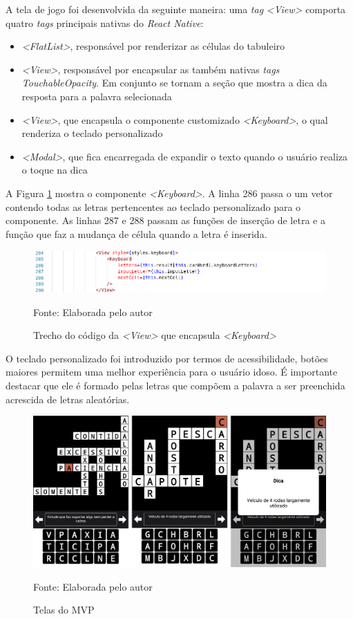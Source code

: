 A tela de jogo foi desenvolvida da seguinte maneira: uma \textit{tag} \textit{<View>} comporta quatro \textit{tags} principais nativas do \textit{React Native}:

\begin{itemize}
    \item \textit{<FlatList>}, responsável por renderizar as células do tabuleiro
    \item \textit{<View>}, responsável por encapsular as também nativas \textit{tags} \textit{TouchableOpacity}. Em conjunto se tornam a seção que mostra a dica da resposta para a palavra selecionada 
    \item \textit{<View>}, que encapsula o componente customizado \textit{<Keyboard>}, o qual renderiza o teclado personalizado
    \item \textit{<Modal>}, que fica encarregada de expandir o texto quando o usuário realiza o toque na dica
\end{itemize}

A Figura \ref{fig:keyboard} mostra o componente \textit{<Keyboard>}. A linha 286 passa o um vetor contendo todas as letras pertencentes ao teclado personalizado para o componente. As linhas 287 e 288 passam as funções de inserção de letra e a função que faz a mudança de célula quando a letra é inserida. 

\begin{figure}[H]
\centering
    \caption{Trecho do código da \textit{<View>} que encapsula \textit{<Keyboard>}}
    \label{fig:keyboard}
    \includegraphics[width=1.0\textwidth]{Figuras/codeKeyboard.png}
    
    Fonte: Elaborada pelo autor
\end{figure}

O teclado personalizado foi introduzido por termos de acessibilidade, botões maiores permitem uma melhor experiência para o usuário idoso. É importante destacar que ele é formado pelas letras que compõem a palavra a ser preenchida acrescida de letras aleatórias.

\begin{figure}[H]
\centering
    \caption{Telas do MVP}
    \label{fig:mvp}
    \includegraphics[width=1.0\textwidth]{Figuras/mvp.png}
    
    Fonte: Elaborada pelo autor
\end{figure}

